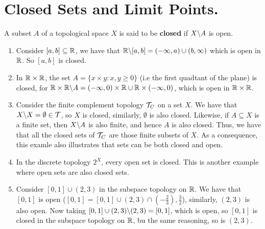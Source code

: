 
\section{Closed Sets and Limit Points.}

\begin{definition}
    A subset $A$ of a topological space  $X$ is said to be  \textbf{closed} if
    $X \backslash A$ is open.		
\end{definition}

\begin{example}
    \begin{enumerate}[label=(\arabic*)]
        \item Consider $[a,b] \subseteq \mathbb{R}$, we have that
            $\mathbb{R} \backslash [a,b]=(-\infty,a) \cup (b, \infty)$ which is open in
            $\mathbb{R}$. So  $[a,b]$ is closed.

        \item In  $\mathbb{R} \times \mathbb{R}$, the set  $A=\{x \times y: x,y \geq 0\}$  (i.e
            the first quadtant of the plane) is closed, for $\mathbb{R} \times
            \mathbb{R} \backslash A=(- \infty,0) \times \mathbb{R} \cup \mathbb{R} \times (-\infty,0)$, which is
            open in $\mathbb{R} \times \mathbb{R}$.

        \item Consider the finite complement topology $\mathcal{T}_C$ on a set  $X$. We
            have that  $X \backslash X=\emptyset \in \mathcal{T}$, so  $X$ is closed,
            similarly,  $\emptyset$ is also closed. Likewise, if  $A \subseteq
            X$ is a finite set, then  $X \backslash A$ is also finite, and hence $A$
            is also closed. Thus, we have that all the closed sets of  $\mathcal{T}_C$
            are those finite subsets of  $X$. As a consequence, this examle also
            illustrates that sets can be both closed and open.

        \item In the discrete topology  $2^X$, every open set is closed. This is
            another example where open sets are also closed sets.

        \item Consider  $[0,1] \cup (2,3)$ in the subspace topology on $\mathbb{R}$. We
            have that  $[0,1]$ is open  ($[0,1]=[0,1] \cup (2,3) \cap
            (-\frac{2}{3}),\frac{3}{2}$), similarly, $(2,3)$ is also open. Now
            taking  $[0,1] \cup (2,3) \backslash (2,3)=[0,1]$, which is open, so
            $[0,1]$ is closed in the subspace topology on  $\mathbb{R}$, bu the same
            reasoning, so is  $(2,3)$.
    \end{enumerate}		
\end{example} 

